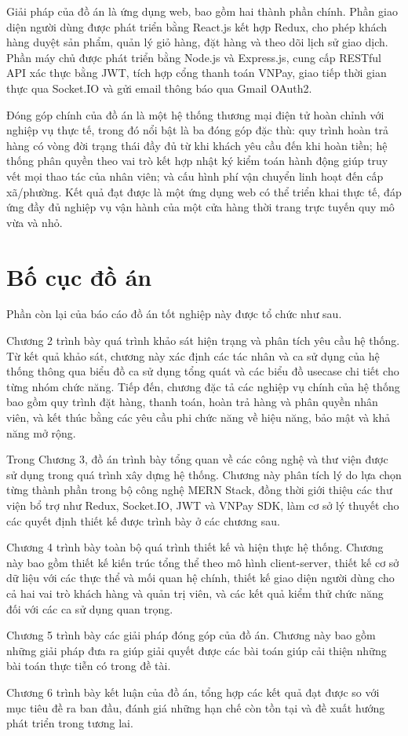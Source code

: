 \documentclass[../DoAn.tex]{subfiles}
\begin{document}
  Giải pháp của đồ án là ứng dụng web, bao gồm hai thành phần chính.
  Phần giao diện người dùng được phát triển bằng React.js kết hợp Redux, cho phép
  khách hàng duyệt sản phẩm, quản lý giỏ hàng, đặt hàng và theo dõi lịch sử giao
  dịch. Phần máy chủ được phát triển bằng Node.js và Express.js, cung cấp RESTful
  API xác thực bằng JWT, tích hợp cổng thanh toán VNPay, giao tiếp thời gian thực
  qua Socket.IO và gửi email thông báo qua Gmail OAuth2.

  Đóng góp chính của đồ án là một hệ thống thương mại điện tử hoàn chỉnh với
  nghiệp vụ thực tế, trong đó nổi bật là ba đóng góp đặc thù: quy trình hoàn trả
  hàng có vòng đời trạng thái đầy đủ từ khi khách yêu cầu đến khi hoàn tiền; hệ
  thống phân quyền theo vai trò kết hợp nhật ký kiểm toán hành động giúp truy vết
  mọi thao tác của nhân viên; và cấu hình phí vận chuyển linh hoạt đến cấp xã/phường.
  Kết quả đạt được là một ứng dụng web có thể triển khai thực tế, đáp ứng đầy đủ
  nghiệp vụ vận hành của một cửa hàng thời trang trực tuyến quy mô vừa và nhỏ.

  \section{Bố cục đồ án}
  \label{section:1.4}
  Phần còn lại của báo cáo đồ án tốt nghiệp này được tổ chức như sau.

  Chương 2 trình bày quá trình khảo sát hiện trạng và phân tích yêu cầu hệ thống.
  Từ kết quả khảo sát, chương này xác định các tác nhân và ca sử dụng của hệ thống
  thông qua biểu đồ ca sử dụng tổng quát và các biểu đồ usecase chi tiết cho
  từng nhóm chức năng. Tiếp đến, chương đặc tả các nghiệp vụ chính của hệ thống
  bao gồm quy trình đặt hàng, thanh toán, hoàn trả hàng và phân quyền nhân viên,
  và kết thúc bằng các yêu cầu phi chức năng về hiệu năng, bảo mật và khả năng
  mở rộng.

  Trong Chương 3, đồ án trình bày tổng quan về các công nghệ và thư viện được sử
  dụng trong quá trình xây dựng hệ thống. Chương này phân tích lý do lựa chọn từng
  thành phần trong bộ công nghệ MERN Stack, đồng thời giới thiệu các thư viện bổ
  trợ như Redux, Socket.IO, JWT và VNPay SDK, làm cơ sở lý thuyết cho các quyết
  định thiết kế được trình bày ở các chương sau.

  Chương 4 trình bày toàn bộ quá trình thiết kế và hiện thực hệ thống. Chương này
  bao gồm thiết kế kiến trúc tổng thể theo mô hình client-server, thiết kế cơ sở
  dữ liệu với các thực thể và mối quan hệ chính, thiết kế giao diện người dùng cho
  cả hai vai trò khách hàng và quản trị viên, và các kết quả kiểm thử chức năng
  đối với các ca sử dụng quan trọng.

  Chương 5 trình bày các giải pháp đóng góp của đồ án. Chương này bao gồm những
  giải pháp đưa ra giúp giải quyết được các bài toán giúp cải thiện những bài toán
  thực tiễn có trong đề tài.

  Chương 6 trình bày kết luận của đồ án, tổng hợp các kết quả đạt được so với mục
  tiêu đề ra ban đầu, đánh giá những hạn chế còn tồn tại và đề xuất hướng phát
  triển trong tương lai.
  
\end{document}
